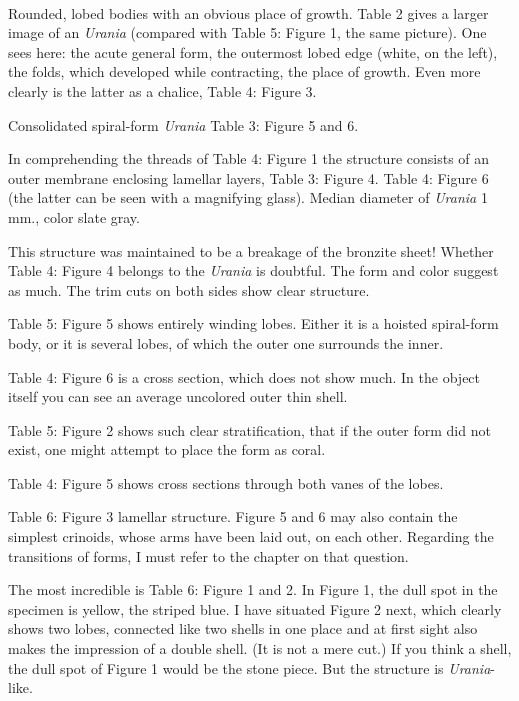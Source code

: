 \documentclass[a4paper, 12pt, oneside]{article}
\begin{document}
\paragraph*{}
Rounded, lobed bodies with an obvious place of growth. Table 2 gives a larger image of an \emph{Urania} (compared with Table 5: Figure 1, the same picture). One sees here: the acute general form, the outermost lobed edge (white, on the left), the folds, which developed while contracting, the place of growth. Even more clearly is the latter as a chalice, Table 4: Figure 3.

Consolidated spiral-form \emph{Urania} Table 3: Figure 5 and 6.

In comprehending the threads of Table 4: Figure 1 the structure consists of an outer membrane enclosing lamellar layers, Table 3: Figure 4. Table 4: Figure 6 (the latter can be seen with a magnifying glass). Median diameter of \emph{Urania} 1 mm., color slate gray.

This structure was maintained to be a breakage of the bronzite sheet! Whether Table 4: Figure 4 belongs to the \emph{Urania} is doubtful. The form and color suggest as much. The trim cuts on both sides show clear structure.

Table 5: Figure 5 shows entirely winding lobes. Either it is a hoisted spiral-form body, or it is several lobes, of which the outer one surrounds the inner.

Table 4: Figure 6 is a cross section, which does not show much. In the object itself you can see an average uncolored outer thin shell.

Table 5: Figure 2 shows such clear stratification, that if the outer form did not exist, one might attempt to place the form as coral.

Table 4: Figure 5 shows cross sections through both vanes of the lobes.

Table 6: Figure 3 lamellar structure. Figure 5 and 6 may also contain the simplest crinoids, whose arms have been laid out, on each other. Regarding the transitions of forms, I must refer to the chapter on that question.

The most incredible is Table 6: Figure 1 and 2. In Figure 1, the dull spot in the specimen is yellow, the striped blue. I have situated Figure 2 next, which clearly shows two lobes, connected like two shells in one place and at first sight also makes the impression of a double shell. (It is not a mere cut.) If you think a shell, the dull spot of Figure 1 would be the stone piece. But the structure is \emph{Urania}-like.
\end{document}
